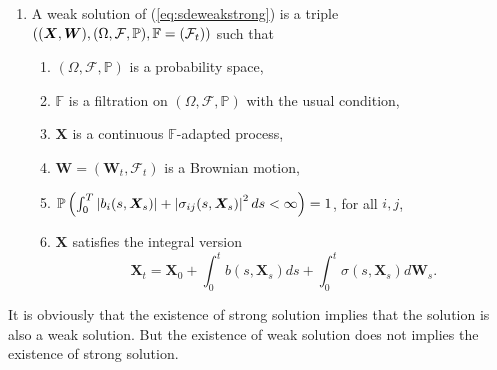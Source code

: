\begin{defn}
\begin{enumerate}[label=(\arabic{*})]
        \item A weak solution of (\ref{eq:sdeweakstrong}) is a triple $\left((\bm{X},\bm{W}),(\Omega,\mathcal{F},\mathbb{P}), \mathbb{F}=(\mathcal{F}_t)\right)$ such that
        \begin{enumerate}[label=(\roman*)]
            \item $(\Omega,\mathcal{F},\mathbb{P})$ is a probability space,
            \item $\mathbb{F}$ is a filtration on $(\Omega,\mathcal{F},\mathbb{P})$ with the usual condition,
            \item $\bm{X}$ is a continuous $\mathbb{F}$-adapted process,
            \item $\bm{W} = (\bm{W}_t,\mathcal{F}_t)$ is a Brownian motion,
            \item $\mathbb{P}\left(\int_0^T \left\lvert b_i(s,\bm{X}_s)\right\lvert + \left\lvert\sigma_{ij}(s,\bm{X}_s)\right\lvert^2 ds < \infty\right) = 1$, for all $i,j$,
            \item $\bm{X}$ satisfies the integral version
            \begin{equation*}
                \bm{X}_t = \bm{X}_0 + \int_0^tb(s,\bm{X}_s)ds+\int_0^t\sigma(s,\bm{X}_s)d\bm{W}_s.
            \end{equation*}
        \end{enumerate}
    \end{enumerate}
\end{defn}
\begin{rmk}
    It is obviously that the existence of strong solution implies that the solution is also a weak solution. But the existence of weak solution does not implies the existence of strong solution.
\end{rmk}

